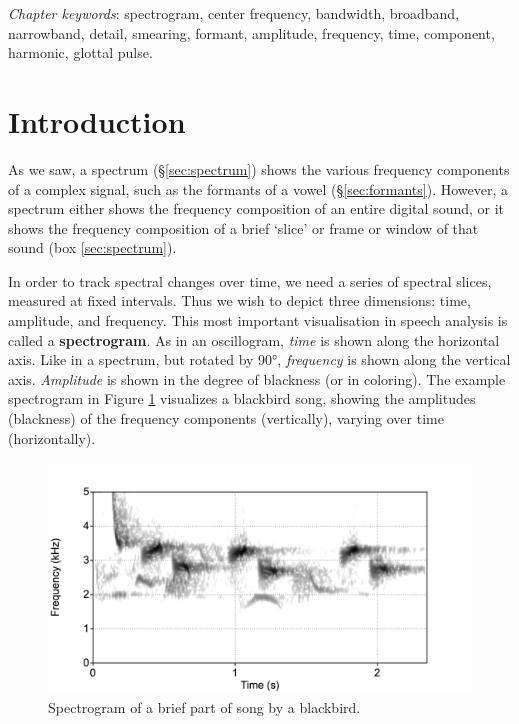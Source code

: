 \documentclass[
]{book}
\begin{document}
\emph{Chapter keywords}: spectrogram, center frequency, bandwidth, broadband, narrowband, detail, smearing, formant, amplitude, frequency, time, component, harmonic, glottal pulse.

\section{Introduction}\label{sec:spectrogram-intro}

As we saw, a spectrum (§\ref{sec:spectrum}) shows the various frequency components of a complex signal, such as the formants of a vowel (§\ref{sec:formants}). However, a spectrum either shows the frequency composition of an entire digital sound, or it shows the frequency composition of a brief `slice' or frame or window of that sound (box \ref{sec:spectrum}).

In order to track spectral changes over time, we need a series of spectral slices, measured at fixed intervals. Thus we wish to depict three dimensions: time, amplitude, and frequency. This most important visualisation in speech analysis is called a \textbf{spectrogram}. As in an oscillogram, \emph{time} is shown along the horizontal axis. Like in a spectrum, but rotated by 90°, \emph{frequency} is shown along the vertical axis. \emph{Amplitude} is shown in the degree of blackness (or in coloring).
The example spectrogram in Figure \ref{fig:merel-spectrogram} visualizes a blackbird song, showing the amplitudes (blackness) of the frequency components (vertically), varying over time (horizontally).

\begin{figure}

{\centering \includegraphics{figures/merel-spectrogram} 

}

\caption{Spectrogram of a brief part of song by a blackbird.}\label{fig:merel-spectrogram}
\end{figure}
\end{document}
